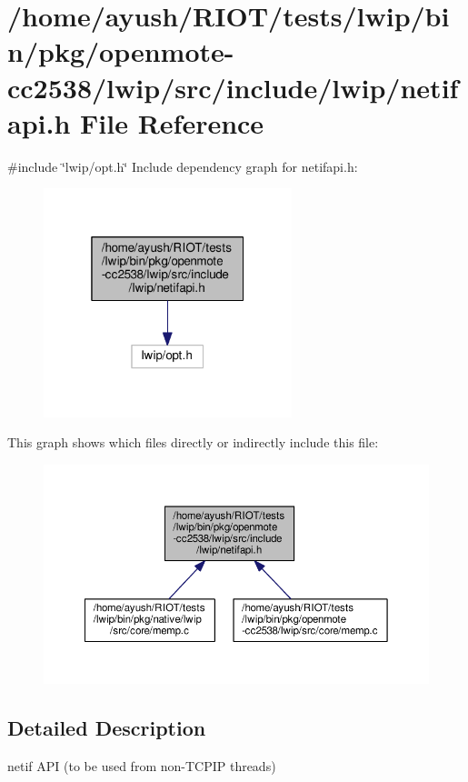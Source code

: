 \hypertarget{openmote-cc2538_2lwip_2src_2include_2lwip_2netifapi_8h}{}\section{/home/ayush/\+R\+I\+O\+T/tests/lwip/bin/pkg/openmote-\/cc2538/lwip/src/include/lwip/netifapi.h File Reference}
\label{openmote-cc2538_2lwip_2src_2include_2lwip_2netifapi_8h}
{\ttfamily \#include \char`\"{}lwip/opt.\+h\char`\"{}}\newline
Include dependency graph for netifapi.\+h\+:
\nopagebreak
\begin{figure}[H]
\begin{center}
\leavevmode
\includegraphics[width=205pt]{openmote-cc2538_2lwip_2src_2include_2lwip_2netifapi_8h__incl}
\end{center}
\end{figure}
This graph shows which files directly or indirectly include this file\+:
\nopagebreak
\begin{figure}[H]
\begin{center}
\leavevmode
\includegraphics[width=350pt]{openmote-cc2538_2lwip_2src_2include_2lwip_2netifapi_8h__dep__incl}
\end{center}
\end{figure}


\subsection{Detailed Description}
netif A\+PI (to be used from non-\/\+T\+C\+P\+IP threads) 